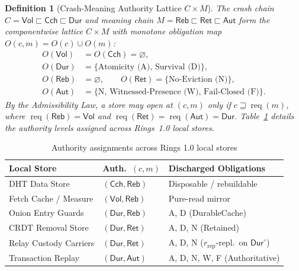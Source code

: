 \documentclass[journal]{IEEEtran}
\newtheorem{definition}{Definition}
\DeclareRobustCommand{\code}[1]{{\ttfamily\renewcommand{\_}{\textunderscore\allowbreak}#1}}
\begin{document}
\begin{definition}[Crash-Meaning Authority Lattice $C\times M$]\label{def:authority-lattice}
The crash chain $C=\mathsf{Vol}\sqsubset\mathsf{Cch}\sqsubset\mathsf{Dur}$ and
meaning chain $M=\mathsf{Reb}\sqsubset\mathsf{Ret}\sqsubset\mathsf{Aut}$ form
the componentwise lattice $C\times M$ with monotone obligation map
$O(c,m)=O(c)\cup O(m)$:
\[
\begin{aligned}
  O(\mathsf{Vol}) &= O(\mathsf{Cch})=\varnothing,\\
  O(\mathsf{Dur}) &= \{\text{Atomicity (A)},\,\text{Survival (D)}\},\\
  O(\mathsf{Reb}) &= \varnothing,\qquad O(\mathsf{Ret})=\{\text{No-Eviction (N)}\},\\
  O(\mathsf{Aut}) &= \{\text{N},\,\text{Witnessed-Presence (W)},\,\text{Fail-Closed (F)}\}.
\end{aligned}
\]
By the Admissibility Law, a store may open at $(c,m)$ only if $c\sqsupseteq\operatorname{req}(m)$, where $\operatorname{req}(\mathsf{Reb})=\mathsf{Vol}$ and $\operatorname{req}(\mathsf{Ret})=\operatorname{req}(\mathsf{Aut})=\mathsf{Dur}$. Table~\ref{tab:durable-stores} details the authority levels assigned across Rings~1.0 local stores.
\end{definition}

\begin{table}[t]
\centering
\caption{Authority assignments across Rings 1.0 local stores}
\label{tab:durable-stores}
\scriptsize
\setlength{\tabcolsep}{2.5pt}
\begin{tabular}{@{}p{2.3cm}p{1.6cm}p{3.9cm}@{}}
\toprule
Local Store & Auth.\ $(c,m)$ & Discharged Obligations \\
\midrule
DHT Data Store & $(\mathsf{Cch},\mathsf{Reb})$ & Disposable / rebuildable \\
Fetch Cache / Measure & $(\mathsf{Vol},\mathsf{Reb})$ & Pure-read mirror \\
Onion Entry Guards & $(\mathsf{Dur},\mathsf{Reb})$ & A, D (\code{DurableCache}) \\
CRDT Removal Store & $(\mathsf{Dur},\mathsf{Ret})$ & A, D, N (\code{Retained}) \\
Relay Custody Carriers & $(\mathsf{Dur},\mathsf{Ret})$ & A, D, N ($r_{\mathrm{rep}}$-repl.\ on $\mathsf{Dur}^\circ$) \\
Transaction Replay & $(\mathsf{Dur},\mathsf{Aut})$ & A, D, N, W, F (\code{Authoritative}) \\
\bottomrule
\end{tabular}
\end{table}
\end{document}
